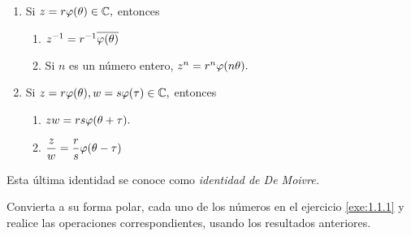  \begin{problema}
 \begin{enumerate}
  \item Si $z=r\varphi(\theta) \in \mathbb{C},$ entonces
  \begin{enumerate}
   \item   $
z^{-1}=r^{-1} \overline{\varphi(\theta)}
  $
    \item Si $n$ es un número entero, $
z^{n}=r^{n}\varphi(n \theta).
  $
  \end{enumerate}


  \item Si $z=r\varphi(\theta), w=s\varphi(\tau) \in \mathbb{C},$ entonces
  \begin{enumerate}
   \item   $
zw=rs\varphi(\theta+\tau).
  $
  \item
  $
\dfrac{z}{w}=\dfrac{r}{s}\varphi(\theta-\tau)
$
  \end{enumerate}





 \end{enumerate}
 
 \end{problema}

 Esta última identidad se conoce como \emph{identidad de De Moivre.}


\begin{problema}
 Convierta a su forma polar, cada uno de los números en el ejercicio \ref{exe:1.1.1} y realice las operaciones
correspondientes, usando los resultados anteriores. 
\end{problema}

 